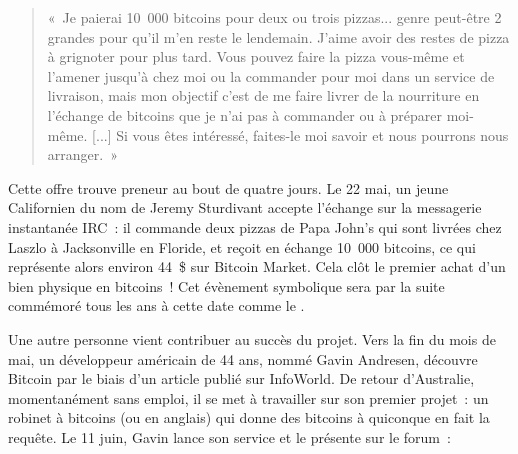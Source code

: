 \begin{quote}
«~Je paierai 10~000 bitcoins pour deux ou trois pizzas... genre peut-être 2 grandes pour qu'il m'en reste le lendemain. J'aime avoir des restes de pizza à grignoter pour plus tard. Vous pouvez faire la pizza vous-même et l'amener jusqu'à chez moi ou la commander pour moi dans un service de livraison, mais mon objectif c'est de me faire livrer de la nourriture en l'échange de bitcoins que je n'ai pas à commander ou à préparer moi-même. [...] Si vous êtes intéressé, faites-le moi savoir et nous pourrons nous arranger.~»
\end{quote}

Cette offre trouve preneur au bout de quatre jours. Le 22 mai, un jeune Californien du nom de Jeremy Sturdivant accepte l'échange sur la messagerie instantanée IRC~: il commande deux pizzas de Papa John's qui sont livrées chez Laszlo à Jacksonville en Floride, et reçoit en échange 10~000 bitcoins, ce qui représente alors environ 44~\$ sur Bitcoin Market. Cela clôt le premier achat d'un bien physique en bitcoins~! Cet évènement symbolique sera par la suite commémoré tous les ans à cette date comme le . %


Une autre personne vient contribuer au succès du projet. Vers la fin du mois de mai, un développeur américain de 44 ans, nommé Gavin Andresen, découvre Bitcoin par le biais d'un article publié sur InfoWorld. De retour d'Australie, momentanément sans emploi, il se met à travailler sur son premier projet~: un robinet à bitcoins (ou  en anglais) qui donne des bitcoins à quiconque en fait la requête. Le 11 juin, Gavin lance son service et le présente sur le forum~:

